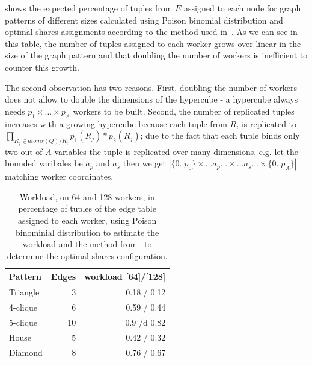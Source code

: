  shows the expected percentage of tuples from $E$ assigned to each node for graph patterns of different sizes calculated using Poison binomial distribution and optimal shares assignments according to the method used in~\cite{myria-detailed}.
As we can see in this table, the number of tuples assigned to each worker grows over linear in the size of the graph pattern and that doubling the number of workers is inefficient to counter this growth.

The second observation has two reasons.
First, doubling the number of workers does not allow to double the dimensions of the hypercube - a hypercube always needs $p_1 \times ... \times p_A$ workers to be built.
Second, the number of replicated tuples increases with a growing hypercube because each tuple from $R_i$ is replicated to $\prod_{R_j \in atoms(Q)/R_i} p_1(R_j) * p_2(R_j)$; due to the fact that each tuple binds only two out of $A$ variables the tuple is replicated over many dimensions, e.g. let the bounded varibales be $a_p$ and $a_s$ then we get  $|\{0..p_0\} \times ... a_p ... \times ... a_s... \times \{0..p_A\}|$ matching worker coordinates.



\begin{table}[t]
    \centering
    \begin{tabular}{lrr}
        \toprule
        Pattern  & Edges  & workload [64]/[128] \\ \midrule
        Triangle & 3                 & 0.18 / 0.12    \\
        4-clique & 6                 & 0.59 / 0.44    \\
        5-clique & 10                & 0.9  /d 0.82    \\
        House    & 5                 & 0.42 / 0.32    \\
        Diamond  & 8                 & 0.76 / 0.67    \\
        \bottomrule
    \end{tabular}
    \caption{Workload, on 64 and 128 workers, in percentage of tuples of the edge table assigned to each worker, using Poison binominial distribution to estimate the workload and the method from~\cite{myria-detailed} to determine the optimal shares configuration.}
    \label{table:workload}
\end{table}

